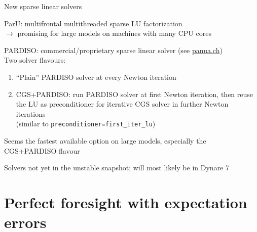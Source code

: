 \documentclass[handout,usepdftitle=false,xcolor=dvipsnames,aspectratio=169]{beamer}
\begin{document}
\begin{frame}{New sparse linear solvers}
  \begin{witemize}
    \item ParU: multifrontal multithreaded sparse LU factorization \\
      $\rightarrow$  promising for large models on machines with many CPU cores
    \item PARDISO: commercial/proprietary sparse linear solver (see \href{https://panua.ch}{panua.ch}) \\
          Two solver flavours:
          \begin{enumerate}
            \item “Plain” PARDISO solver at every Newton iteration
            \item CGS+PARDISO: run PARDISO solver at first Newton iteration, then reuse the LU as preconditioner for iterative CGS solver in further Newton iterations\\
            
                  (similar to \texttt{preconditioner=first\_iter\_lu})
          \end{enumerate}
          Seems the fastest available option on large models, especially the
          CGS+PARDISO flavour
    \item Solvers not yet in the unstable snapshot; will most likely be in
          Dynare 7
  \end{witemize}
\end{frame}



\section[Unexpected shocks]{Perfect foresight with expectation errors}
\end{document}
